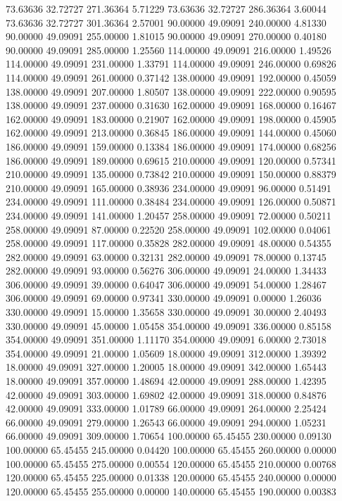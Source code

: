 73.63636 32.72727 271.36364 5.71229
73.63636 32.72727 286.36364 3.60044
73.63636 32.72727 301.36364 2.57001
90.00000 49.09091 240.00000 4.81330
90.00000 49.09091 255.00000 1.81015
90.00000 49.09091 270.00000 0.40180
90.00000 49.09091 285.00000 1.25560
114.00000 49.09091 216.00000 1.49526
114.00000 49.09091 231.00000 1.33791
114.00000 49.09091 246.00000 0.69826
114.00000 49.09091 261.00000 0.37142
138.00000 49.09091 192.00000 0.45059
138.00000 49.09091 207.00000 1.80507
138.00000 49.09091 222.00000 0.90595
138.00000 49.09091 237.00000 0.31630
162.00000 49.09091 168.00000 0.16467
162.00000 49.09091 183.00000 0.21907
162.00000 49.09091 198.00000 0.45905
162.00000 49.09091 213.00000 0.36845
186.00000 49.09091 144.00000 0.45060
186.00000 49.09091 159.00000 0.13384
186.00000 49.09091 174.00000 0.68256
186.00000 49.09091 189.00000 0.69615
210.00000 49.09091 120.00000 0.57341
210.00000 49.09091 135.00000 0.73842
210.00000 49.09091 150.00000 0.88379
210.00000 49.09091 165.00000 0.38936
234.00000 49.09091 96.00000 0.51491
234.00000 49.09091 111.00000 0.38484
234.00000 49.09091 126.00000 0.50871
234.00000 49.09091 141.00000 1.20457
258.00000 49.09091 72.00000 0.50211
258.00000 49.09091 87.00000 0.22520
258.00000 49.09091 102.00000 0.04061
258.00000 49.09091 117.00000 0.35828
282.00000 49.09091 48.00000 0.54355
282.00000 49.09091 63.00000 0.32131
282.00000 49.09091 78.00000 0.13745
282.00000 49.09091 93.00000 0.56276
306.00000 49.09091 24.00000 1.34433
306.00000 49.09091 39.00000 0.64047
306.00000 49.09091 54.00000 1.28467
306.00000 49.09091 69.00000 0.97341
330.00000 49.09091 0.00000 1.26036
330.00000 49.09091 15.00000 1.35658
330.00000 49.09091 30.00000 2.40493
330.00000 49.09091 45.00000 1.05458
354.00000 49.09091 336.00000 0.85158
354.00000 49.09091 351.00000 1.11170
354.00000 49.09091 6.00000 2.73018
354.00000 49.09091 21.00000 1.05609
18.00000 49.09091 312.00000 1.39392
18.00000 49.09091 327.00000 1.20005
18.00000 49.09091 342.00000 1.65443
18.00000 49.09091 357.00000 1.48694
42.00000 49.09091 288.00000 1.42395
42.00000 49.09091 303.00000 1.69802
42.00000 49.09091 318.00000 0.84876
42.00000 49.09091 333.00000 1.01789
66.00000 49.09091 264.00000 2.25424
66.00000 49.09091 279.00000 1.26543
66.00000 49.09091 294.00000 1.05231
66.00000 49.09091 309.00000 1.70654
100.00000 65.45455 230.00000 0.09130
100.00000 65.45455 245.00000 0.04420
100.00000 65.45455 260.00000 0.00000
100.00000 65.45455 275.00000 0.00554
120.00000 65.45455 210.00000 0.00768
120.00000 65.45455 225.00000 0.01338
120.00000 65.45455 240.00000 0.00000
120.00000 65.45455 255.00000 0.00000
140.00000 65.45455 190.00000 0.00383
